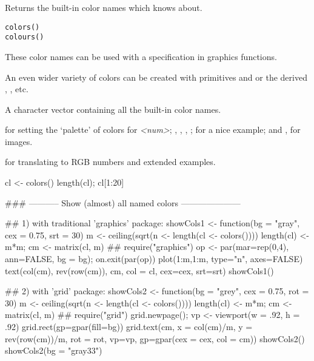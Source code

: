 %
\begin{Description}\relax
Returns the built-in color names which \R{} knows about.
\end{Description}
%
\begin{Usage}
\begin{verbatim}
colors()
colours()
\end{verbatim}
\end{Usage}
%
\begin{Details}\relax
These color names can be used with a  specification in
graphics functions.

An even wider variety of colors can be created with primitives
 and  or the derived ,
, etc.
\end{Details}
%
\begin{Value}
A character vector containing all the built-in color names.
\end{Value}
%
\begin{SeeAlso}\relax
{} for setting the `palette' of colors for
\emph{<num>}\code{)};
, , , ;
 for a nice example;
and ,  for images.

 for translating to RGB numbers and extended
examples.
\end{SeeAlso}
%
\begin{Examples}
\begin{ExampleCode}
cl <- colors()
length(cl); cl[1:20]

### ----------- Show (almost) all named colors ---------------------

## 1) with traditional 'graphics' package:
showCols1 <- function(bg = "gray", cex = 0.75, srt = 30) {
    m <- ceiling(sqrt(n <- length(cl <- colors())))
    length(cl) <- m*m; cm <- matrix(cl, m)
    ##
    require("graphics")
    op <- par(mar=rep(0,4), ann=FALSE, bg = bg); on.exit(par(op))
    plot(1:m,1:m, type="n", axes=FALSE)
    text(col(cm), rev(row(cm)), cm,  col = cl, cex=cex, srt=srt)
}
showCols1()

## 2) with 'grid' package:
showCols2 <- function(bg = "grey", cex = 0.75, rot = 30) {
    m <- ceiling(sqrt(n <- length(cl <- colors())))
    length(cl) <- m*m; cm <- matrix(cl, m)
    ##
    require("grid")
    grid.newpage(); vp <- viewport(w = .92, h = .92)
    grid.rect(gp=gpar(fill=bg))
    grid.text(cm, x = col(cm)/m, y = rev(row(cm))/m, rot = rot,
              vp=vp, gp=gpar(cex = cex, col = cm))
}
showCols2()
showCols2(bg = "gray33")
\end{ExampleCode}
\end{Examples}
